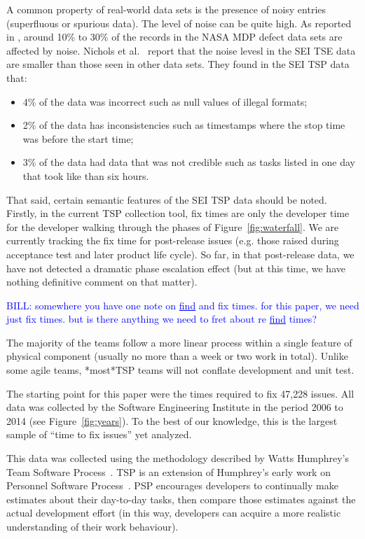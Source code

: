 \documentclass{sig-alternate}
\newcommand{\bill}[1]{\textcolor{blue}{BILL: #1}}
\newcommand{\bi}{\begin{itemize}[leftmargin=0.4cm]}
\newcommand{\ei}{\end{itemize}}
\newcommand{\fig}[1]{Figure~\ref{fig:#1}}
\begin{document}
A common property of real-world data sets is the presence
of noisy entries (superfluous  or spurious data). 
The level of noise can be quite high. As reported
in \cite{shepperd12}, around
10\% to 30\%
of the records in the NASA MDP defect data sets are
affected by noise. Nichols et al.~\cite{shirai14}  report that
the noise levesl in the SEI TSE data are smaller than those seen
in other data sets. They found in the SEI TSP data that:\bi 
\item
4\% of the data was incorrect such as  null values of illegal formats;
\item  2\% of the data has inconsistencies such as timestamps
where the stop time was before the start time;
\item 3\% of the data had data that was not credible
such as tasks listed in one day that took like than six hours.
\ei 
That said, certain semantic features of the SEI TSP data should be noted.
Firstly, in the current TSP collection tool, 
fix times are only the developer time for the developer walking through the phases of \fig{waterfall}.
We are currently tracking the fix time for post-release issues (e.g. those raised during  acceptance test and later
product life cycle). So far, in that post-release data,  we have not detected
a dramatic phase escalation effect (but at this time, we have nothing definitive comment on that matter).

\bill{somewhere you have one note on \underline{find} and fix times.  for this paper, we need just fix times. but is there
anything we need to fret about re \underline{find} times?}

The majority of the teams follow a more linear process within a single feature of physical component (usually no more than a week or two work in total). Unlike some agile teams, *most*TSP teams will not conflate development and unit test.

The starting point for this paper were the times required to fix 47,228 issues.
All data was collected
by the Software Engineering Institute in the period 2006 to 2014 (see \fig{years}).
To the best of our knowledge, this is the largest sample of ``time to fix issues''
yet analyzed. 

This data was collected using the   methodology described by
Watts Humphrey's Team Software Process~\cite{tsp00}. TSP is an extension of Humphrey's early
work on Personnel Software Process~\cite{psp05}.  PSP encourages developers to continually make estimates
about their day-to-day tasks, then compare those estimates against the actual development effort
(in this way, developers can acquire a more realistic understanding of their work behaviour).
\end{document}
